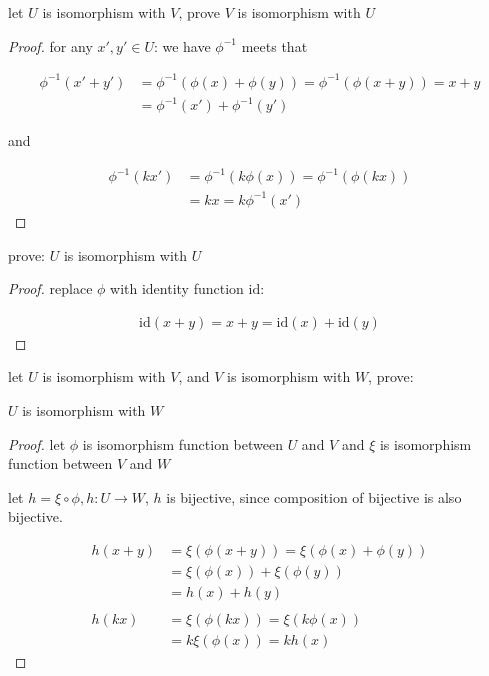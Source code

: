 \begin{exercise}
   let $U$ is isomorphism with $V$, prove $V$ is isomorphism with $U$ 

\end{exercise}

\begin{proof}
   for any $x', y' \in U$: we have $\phi^{-1}$ meets that

   \begin{align*}
    \phi^{-1}(x' + y') &= \phi^{-1}(\phi(x) + \phi(y)) = \phi^{-1}(\phi(x+y)) = x + y \\
    &= \phi^{-1}(x') + \phi^{-1}(y')
   \end{align*}

   and

   \begin{align*}
    \phi^{-1}(kx') &= \phi^{-1}(k\phi(x)) = \phi^{-1}(\phi(kx)) \\
    & = kx = k\phi^{-1}(x')
   \end{align*}
\end{proof}

\begin{exercise}
    prove: $U$ is isomorphism with $U$
\end{exercise}

\begin{proof}
    replace $\phi$ with identity function $\mathrm{id}$:

    \begin{align*}
        \mathrm{id}(x + y) = x + y = \mathrm{id}(x) + \mathrm{id}(y)
    \end{align*}
\end{proof}

\begin{exercise}
   let $U$ is isomorphism with $V$, and $V$ is isomorphism with $W$, prove:

   $U$ is isomorphism with $W$
\end{exercise}

\begin{proof}
    let $\phi$ is isomorphism function between $U$ and $V$ and $\xi$ is isomorphism function between $V$ and $W$

    let $h = \xi \circ \phi, h: U \to W$, $h$ is bijective, since composition of bijective is also bijective.

    \begin{align*}
        h(x+y) &= \xi(\phi(x+y)) = \xi(\phi(x) + \phi(y)) \\
            & = \xi(\phi(x)) + \xi(\phi(y)) \\
            &= h(x) + h(y) \\
            \\
        h(kx) &= \xi(\phi(kx)) = \xi(k\phi(x)) \\
        &= k\xi(\phi(x)) = kh(x)
    \end{align*}
\end{proof}


